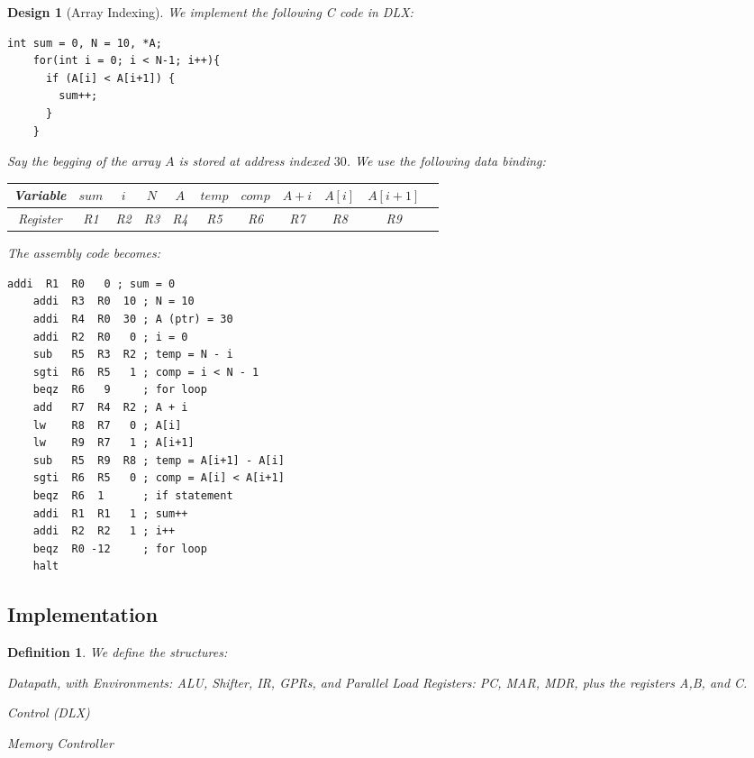 \documentclass[12pt]{article}
\newtheorem{definition}[theorem]{Definition}
\newtheorem{design}[theorem]{Design}
\begin{document}
\begin{design}[Array Indexing]
  We implement the following C code in DLX:
  \begin{lstlisting}[style=C]
    int sum = 0, N = 10, *A;
    for(int i = 0; i < N-1; i++){
      if (A[i] < A[i+1]) {
        sum++;
      }
    }
  \end{lstlisting}
  \noindent Say the begging of the array $A$ is stored at address indexed $30$. We use the following data binding:
  \begin{table}[H]
    \centering
    \begin{tabular}{|*{11}{c|}}\hline
      Variable & $sum$ & $i$ & $N$ & $A$ & $temp$ & $comp$ & $A+i$ & $A[i]$ & $A[i+1]$ \\\hline
      Register & R1 & R2 & R3 & R4 & R5 & R6 & R7 & R8 & R9 \\\hline
    \end{tabular}
  \end{table}
  \noindent The assembly code becomes:
  \begin{lstlisting}[style=DLX]
    addi  R1  R0   0 ; sum = 0
    addi  R3  R0  10 ; N = 10
    addi  R4  R0  30 ; A (ptr) = 30
    addi  R2  R0   0 ; i = 0
    sub   R5  R3  R2 ; temp = N - i
    sgti  R6  R5   1 ; comp = i < N - 1
    beqz  R6   9     ; for loop
    add   R7  R4  R2 ; A + i
    lw    R8  R7   0 ; A[i]
    lw    R9  R7   1 ; A[i+1]
    sub   R5  R9  R8 ; temp = A[i+1] - A[i]
    sgti  R6  R5   0 ; comp = A[i] < A[i+1]
    beqz  R6  1      ; if statement
    addi  R1  R1   1 ; sum++
    addi  R2  R2   1 ; i++
    beqz  R0 -12     ; for loop
    halt
  \end{lstlisting}
\end{design}

\pagebreak

\subsection{Implementation}

\begin{definition}
  We define the structures:
  \begin{compactitem}
    \item Datapath, with Environments: ALU, Shifter, IR, GPRs, and Parallel Load Registers: PC, MAR, MDR, plus the registers A,B, and C.
    \item Control (DLX)
    \item Memory Controller
  \end{compactitem}
\end{definition}
\end{document}
